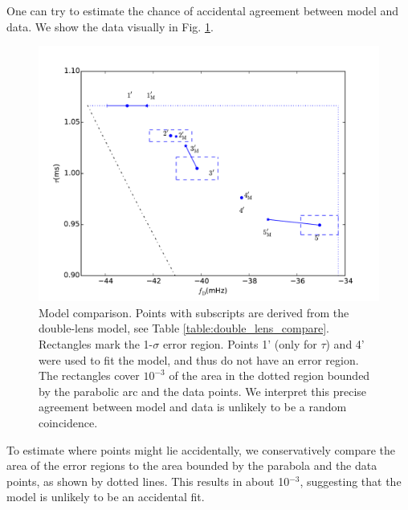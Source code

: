 \documentclass[useAMS,usenatbib]{mn2e}
\begin{document}
One can try to estimate the chance of accidental agreement between
model and data.
We show the data visually in Fig. \ref{fig:tau-fD}.  
\begin{figure}
\centering
\includegraphics[width=1.0\linewidth, angle=0]{tau-fD.pdf}
\caption{Model comparison.
Points with subscripts are derived from the double-lens model, see
Table \ref{table:double_lens_compare}.  
Rectangles mark the 1-$\sigma$ error region.
Points 1' (only for $\tau$) and 4' were used to fit the model, and
thus do not have an error region.  The rectangles cover $10^{-3}$ of
the area in the dotted region bounded by the parabolic arc and the
data points.  We interpret this precise agreement
between model and data 
is unlikely to be a random coincidence.
}
\label{fig:tau-fD}
\end{figure}

To estimate where points might lie accidentally, we conservatively
compare the area of the error regions to the area bounded by the
parabola and the data points, as shown by dotted lines.  This results
in about 10$^{-3}$, suggesting that the model is unlikely to be an
accidental fit.
\end{document}
